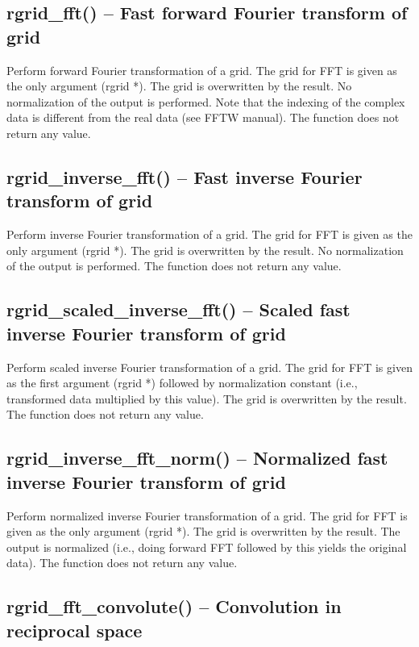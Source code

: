 \documentclass[12pt,letterpaper]{report}
\begin{document}
\subsection{rgrid\_fft() -- Fast forward Fourier transform of grid}

Perform forward Fourier transformation of a grid. The grid for FFT is given as the only argument (rgrid *). The grid is overwritten by the result. No normalization of the output is performed. Note that the indexing of the complex data is different from the real data (see FFTW manual). The function does not return any value. 

\subsection{rgrid\_inverse\_fft() -- Fast inverse Fourier transform of grid}

Perform inverse Fourier transformation of a grid. The grid for FFT is given as the only argument (rgrid *). The grid is overwritten by the result. No normalization of the output is performed. The function does not return any value.

\subsection{rgrid\_scaled\_inverse\_fft() -- Scaled fast inverse Fourier transform of grid}

Perform scaled inverse Fourier transformation of a grid. The grid for FFT is given as the first argument (rgrid *) followed by normalization constant (i.e., transformed data multiplied by this value). The grid is overwritten by the result. The function does not return any value.

\subsection{rgrid\_inverse\_fft\_norm() -- Normalized fast inverse Fourier transform of grid}

Perform normalized inverse Fourier transformation of a grid. The grid for FFT is given as the only argument (rgrid *). The grid is overwritten by the result. The output is normalized (i.e., doing forward FFT followed by this yields the original data). The function does not return any value.

\subsection{rgrid\_fft\_convolute() -- Convolution in reciprocal space}
\end{document}
